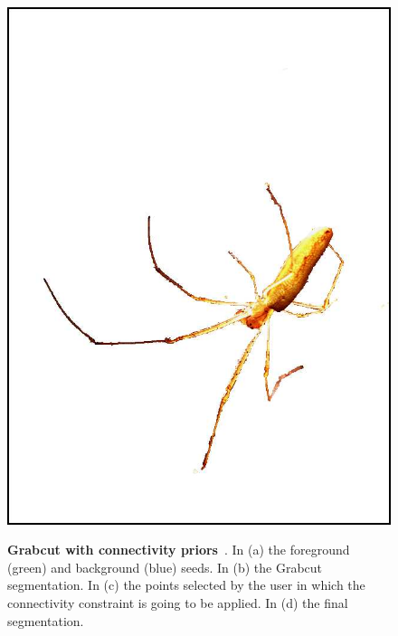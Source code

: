 \begin{figure}
{\includegraphics[scale=0.15]{figures/chapter2/grabcut-connectivity/cp-4.png}
}
\caption{\textbf{Grabcut with connectivity priors}~\cite{vicente08graph}. In (a) the foreground (green) and background (blue) seeds. In (b) the Grabcut segmentation. In (c) the points selected by the user in which the connectivity constraint is going to be applied. In (d) the final segmentation. }
\label{ch2:fig:grabcut-connectivity}
\end{figure}

